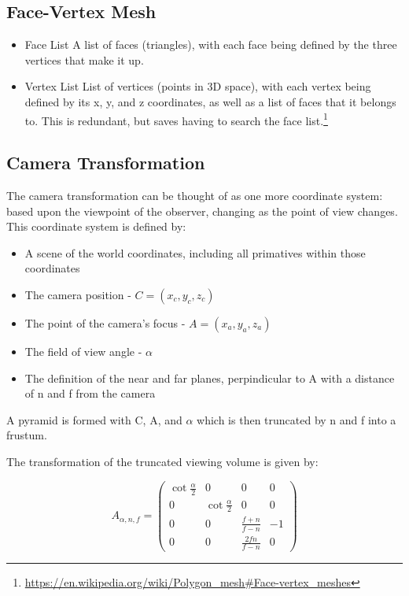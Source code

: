 \documentclass{article}
\begin{document}
\subsection{Face-Vertex Mesh}
\begin{itemize}
\item Face List
A list of faces (triangles), with each face being defined by the three vertices that make it up.
\item Vertex List
List of vertices (points in 3D space), with each vertex being defined by its x, y, and z coordinates, as well as a list of faces that it belongs to. This is redundant, but saves having to search the face list.\footnote{\url{https://en.wikipedia.org/wiki/Polygon_mesh\#Face-vertex_meshes}}
\end{itemize}

\subsection{Camera Transformation}
The camera transformation can be thought of as one more coordinate system: based upon the viewpoint of the observer, changing as the point of view changes. This coordinate system is defined  by:

\begin{itemize}
\item A scene of the world coordinates, including all primatives within those coordinates
\item The camera position - $C = (x_{c}, y_{c}, z_{c})$
\item The point of the camera's focus - $A = (x_{a}, y_{a}, z_{a})$
\item The field of view angle - $\alpha$
\item The definition of the near and far planes, perpindicular to A with a distance of n and f from the camera
\end{itemize}

A pyramid is formed with C, A, and $\alpha$ which is then truncated by n and f into a frustum.

The transformation of the truncated viewing volume is given by:

\[A_{\alpha, n, f} = 
\begin{pmatrix}
\cot \frac{\alpha}{2} & 0 & 0 & 0 \\
0 & \cot \frac{\alpha}{2} & 0 & 0 \\
0 & 0 & \frac{f+n}{f-n} & -1 \\
0 & 0 & \frac{2fn}{f-n} & 0
\end{pmatrix}\]
\end{document}
